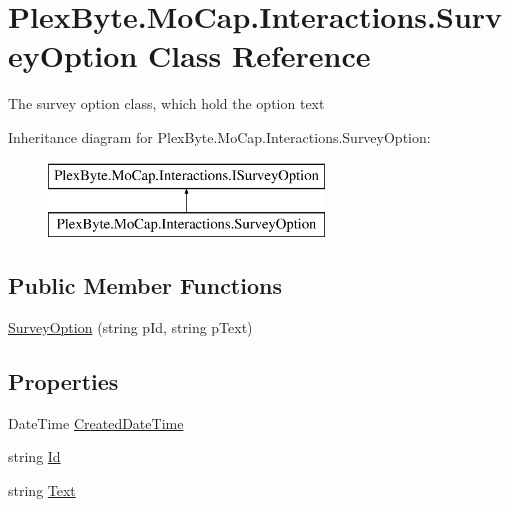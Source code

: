 \hypertarget{class_plex_byte_1_1_mo_cap_1_1_interactions_1_1_survey_option}{}\section{Plex\+Byte.\+Mo\+Cap.\+Interactions.\+Survey\+Option Class Reference}
\label{class_plex_byte_1_1_mo_cap_1_1_interactions_1_1_survey_option}


The survey option class, which hold the option text  


Inheritance diagram for Plex\+Byte.\+Mo\+Cap.\+Interactions.\+Survey\+Option\+:\begin{figure}[H]
\begin{center}
\leavevmode
\includegraphics[height=2.000000cm]{class_plex_byte_1_1_mo_cap_1_1_interactions_1_1_survey_option}
\end{center}
\end{figure}
\subsection*{Public Member Functions}
\begin{DoxyCompactItemize}
\item 
\hyperlink{class_plex_byte_1_1_mo_cap_1_1_interactions_1_1_survey_option_ac4666dca9aede99181a51765fd0cd2bf}{Survey\+Option} (string p\+Id, string p\+Text)
\end{DoxyCompactItemize}
\subsection*{Properties}
\begin{DoxyCompactItemize}
\item 
Date\+Time \hyperlink{class_plex_byte_1_1_mo_cap_1_1_interactions_1_1_survey_option_a48d9a33c1256d0e03c9d2590af766865}{Created\+Date\+Time}
\item 
string \hyperlink{class_plex_byte_1_1_mo_cap_1_1_interactions_1_1_survey_option_a9da80b0469096482b36fcfd126063d13}{Id}
\item 
string \hyperlink{class_plex_byte_1_1_mo_cap_1_1_interactions_1_1_survey_option_a87cdd508f7cd9c80828c420486202bca}{Text}
\end{DoxyCompactItemize}


